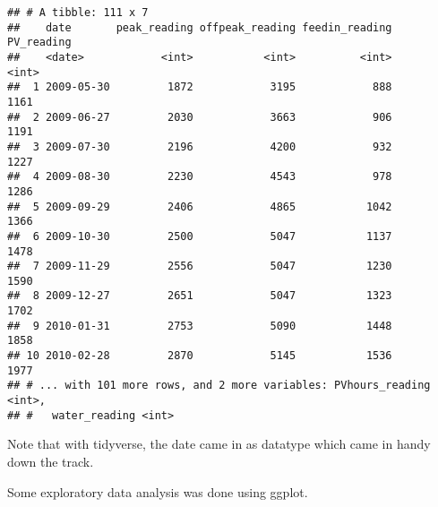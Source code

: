 \documentclass[]{article}
\begin{document}
\begin{verbatim}
## # A tibble: 111 x 7
##    date       peak_reading offpeak_reading feedin_reading PV_reading
##    <date>            <int>           <int>          <int>      <int>
##  1 2009-05-30         1872            3195            888       1161
##  2 2009-06-27         2030            3663            906       1191
##  3 2009-07-30         2196            4200            932       1227
##  4 2009-08-30         2230            4543            978       1286
##  5 2009-09-29         2406            4865           1042       1366
##  6 2009-10-30         2500            5047           1137       1478
##  7 2009-11-29         2556            5047           1230       1590
##  8 2009-12-27         2651            5047           1323       1702
##  9 2010-01-31         2753            5090           1448       1858
## 10 2010-02-28         2870            5145           1536       1977
## # ... with 101 more rows, and 2 more variables: PVhours_reading <int>,
## #   water_reading <int>
\end{verbatim}

Note that with tidyverse, the date came in as datatype which came in
handy down the track.

Some exploratory data analysis was done using ggplot.
\end{document}
